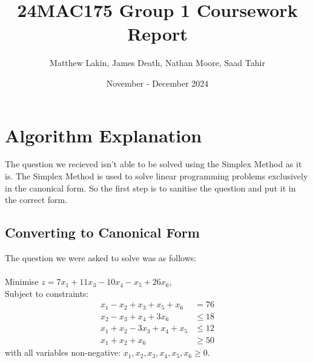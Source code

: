 \documentclass{article}
\title{24MAC175 Group 1 Coursework Report}
\author{Matthew Lakin, James Death, Nathan Moore, Saad Tahir}
\date{November - December 2024}
\numberwithin{equation}{section}
\begin{document}
\maketitle
\newpage
\tableofcontents
\newpage

\section{Algorithm Explanation}
The question we recieved isn't able to be solved using the Simplex Method as it is. The Simplex Method is used to solve linear programming problems exclusively in the canonical form. So the first step is to sanitise the question and put it in the correct form.
\subsection{Converting to Canonical Form}
The question we were asked to solve was as follows: \\ \\
Minimise $z = 7x_1 + 11x_3 - 10x_4 - x_5 + 26x_6$,\\Subject to constraints:
\begin{align}
    x_1 - x_2 + x_3 + x_5 + x_6 &= 76  \label{lpp1:constraint1} \\
    x_2 - x_3 + x_4 + 3x_6 &\leq 18 \label{lpp1:constraint2} \\
    x_1 + x_2 - 3x_3 + x_4 + x_5 &\leq 12 \label{lpp1:constraint3} \\
    x_1 + x_2 + x_6 &\geq 50 \label{lpp1:constraint4}
\end{align}
with all variables non-negative: $x_1, x_2, x_3, x_4, x_5, x_6 \geq 0$. \\ 
\end{document}
